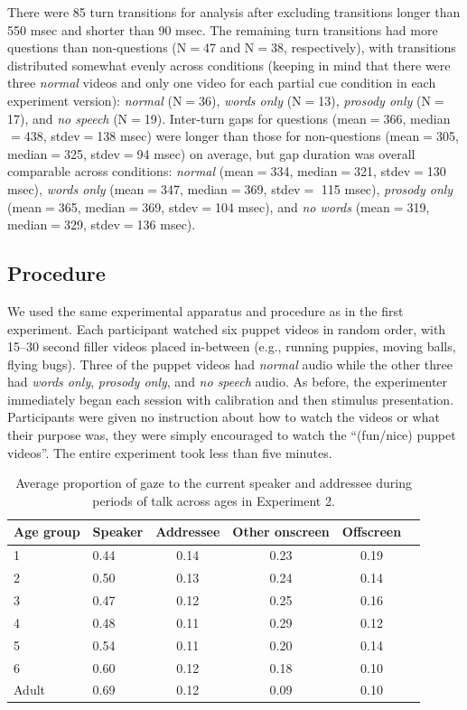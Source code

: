 \documentclass[authoryear, 12pt]{elsarticle}
\begin{document}
There were 85 turn transitions for analysis after excluding transitions longer than 550 msec and shorter than 90 msec. The remaining turn transitions had more questions than non-questions (N$=$47 and N$=$38, respectively), with transitions distributed somewhat evenly across conditions (keeping in mind that there were three \textit{normal} videos and only one video for each partial cue condition in each experiment version): \textit{normal} (N$=$36), \textit{words only} (N$=$13), \textit{prosody only} (N$=$17), and \textit{no speech} (N$=$19). Inter-turn gaps for questions (mean$=$366, median$=$438, stdev$=$138 msec) were longer than those for non-questions (mean$=$305, median$=$325, stdev$=$94 msec) on average, but gap duration was overall comparable across conditions: \textit{normal} (mean$=$334, median$=$321, stdev$=$130 msec), \textit{words only} (mean$=$347, median$=$369, stdev$=$ 115 msec), \textit{prosody only} (mean$=$365, median$=$369, stdev$=$104 msec), and \textit{no words} (mean$=$319, median$=$329, stdev$=$136 msec).

\subsection*{Procedure}
We used the same experimental apparatus and procedure as in the first experiment. Each participant watched six puppet videos in random order, with 15--30 second filler videos placed in-between (e.g., running puppies, moving balls, flying bugs). Three of the puppet videos had \textit{normal} audio while the other three had \textit{words only}, \textit{prosody only}, and \textit{no speech} audio. As before, the experimenter immediately began each session with calibration and then stimulus presentation. Participants were given no instruction about how to watch the videos or what their purpose was, they were simply encouraged to watch the ``(fun/nice) puppet videos''. The entire experiment took less than five minutes.

\linespread{1}
\begin{table}[t]
\begin{center}
  \begin{tabular}{llcccc}
    \hline
    Age group & Speaker & Addressee & Other onscreen & Offscreen\\
    \hline
    1 & 0.44 & 0.14 & 0.23 & 0.19 \\
    2 & 0.50 & 0.13 & 0.24 & 0.14 \\
    3 & 0.47 & 0.12 & 0.25 & 0.16 \\
    4 & 0.48 & 0.11 & 0.29 & 0.12 \\
    5 & 0.54 & 0.11 & 0.20 & 0.14 \\
    6 & 0.60 & 0.12 & 0.18 & 0.10 \\
    Adult & 0.69 & 0.12 & 0.09 & 0.10 \\
    \hline
  \end{tabular}
\end{center}
  \caption{Average proportion of gaze to the current speaker and addressee during periods of talk across ages in Experiment 2.}
\label{tab:look_e2}
\end{table}
\end{document}
